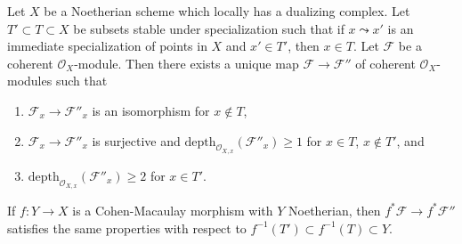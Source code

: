 \begin{lemma}
\label{lemma-make-S2-along-T}
Let $X$ be a Noetherian scheme which locally has a dualizing complex.
Let $T' \subset T \subset X$ be subsets stable under specialization
such that if $x \leadsto x'$ is an immediate specialization
of points in $X$ and $x' \in T'$, then $x \in T$. Let $\mathcal{F}$
be a coherent $\mathcal{O}_X$-module.
Then there exists a unique map $\mathcal{F} \to \mathcal{F}''$
of coherent $\mathcal{O}_X$-modules such that
\begin{enumerate}
\item $\mathcal{F}_x \to \mathcal{F}''_x$ is an isomorphism
for $x \not \in T$,
\item $\mathcal{F}_x \to \mathcal{F}''_x$ is surjective
and $\text{depth}_{\mathcal{O}_{X, x}}(\mathcal{F}''_x) \geq 1$
for $x \in T$, $x \not \in T'$, and
\item $\text{depth}_{\mathcal{O}_{X, x}}(\mathcal{F}''_x) \geq 2$
for $x \in T'$.
\end{enumerate}
If $f : Y \to X$ is a Cohen-Macaulay morphism with $Y$ Noetherian,
then $f^*\mathcal{F} \to f^*\mathcal{F}''$ satisfies the same properties
with respect to $f^{-1}(T') \subset f^{-1}(T) \subset Y$.
\end{lemma}

